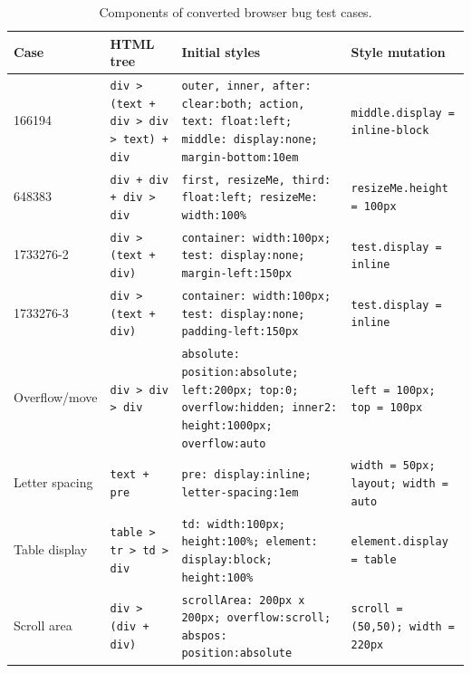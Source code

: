 \begin{table}[t]
  \centering
  \caption{Components of converted browser bug test cases.}
  \label{tab:reproducible-bug-components}
  \fontsize{7}{8}\selectfont
  \setlength{\tabcolsep}{3pt}
  \renewcommand{\arraystretch}{1.12}
  \begin{tabular}{@{}p{}p{}p{}p{}@{}}
    \toprule
    Case & HTML tree & Initial styles & Style mutation \\
    \midrule
    166194 &
    \texttt{div > (text + div > div > text) + div} &
    \texttt{outer, inner, after: clear:both; action, text: float:left; middle: display:none; margin-bottom:10em} &
    \texttt{middle.display = inline-block} \\
    \midrule

    648383 &
    \texttt{div + div + div > div} &
    \texttt{first, resizeMe, third: float:left; resizeMe: width:100\%} &
    \texttt{resizeMe.height = 100px} \\
    \midrule

    1733276-2 &
    \texttt{div > (text + div)} &
    \texttt{container: width:100px; test: display:none; margin-left:150px} &
    \texttt{test.display = inline} \\
    \midrule

    1733276-3 &
    \texttt{div > (text + div)} &
    \texttt{container: width:100px; test: display:none; padding-left:150px} &
    \texttt{test.display = inline} \\
    \midrule

    Overflow/move &
    \texttt{div > div > div} &
    \texttt{absolute: position:absolute; left:200px; top:0; overflow:hidden; inner2: height:1000px; overflow:auto} &
    \texttt{left = 100px; top = 100px} \\
    \midrule

    Letter spacing &
    \texttt{text + pre} &
    \texttt{pre: display:inline; letter-spacing:1em} &
    \texttt{width = 50px; layout; width = auto} \\
    \midrule

    Table display &
    \texttt{table > tr > td > div} &
    \texttt{td: width:100px; height:100\%; element: display:block; height:100\%} &
    \texttt{element.display = table} \\
    \midrule

    Scroll area &
    \texttt{div > (div + div)} &
    \texttt{scrollArea: 200px x 200px; overflow:scroll; abspos: position:absolute} &
    \texttt{scroll = (50,50); width = 220px} \\
    \midrule


\end{tabular}
\end{table}
